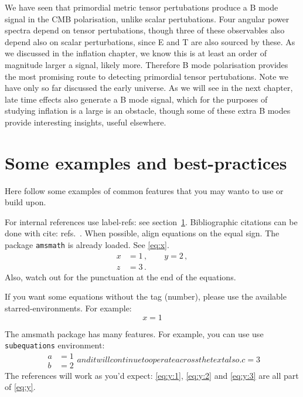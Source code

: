 \documentclass[a4paper,11pt]{article}
\begin{document}
We have seen that primordial metric tensor pertubations produce a B mode signal in the CMB polarisation, unlike scalar pertubations. Four angular power spectra depend on tensor pertubations, though three of these observables also depend also on scalar perturbations, since E and T are also sourced by  these. As we discussed in the inflation chapter, we know this is at least an order of magnitude larger a signal, likely more. Therefore B mode polarisation provides the most promising route to detecting primordial tensor pertubations. Note we have only so far discussed the early universe. As we will see in the next chapter, late time effects also generate a B mode signal, which for the purposes of studying inflation is a large is an obstacle, though some of these extra B modes provide interesting insights, useful elsewhere.














\section{Some examples and best-practices}
\label{sec:intro}

Here follow some examples of common features that you may wanto to use
or build upon.

For internal references use label-refs: see section~\ref{sec:intro}.
Bibliographic citations can be done with cite: refs.~\cite{a,b,c}.
When possible, align equations on the equal sign. The package
\texttt{amsmath} is already loaded. See \eqref{eq:x}.
\begin{equation}
\label{eq:x}
\begin{split}
x &= 1 \,,
\qquad
y = 2 \,,
\\
z &= 3 \,.
\end{split}
\end{equation}
Also, watch out for the punctuation at the end of the equations.


If you want some equations without the tag (number), please use the available
starred-environments. For example:
\begin{equation*}
x = 1
\end{equation*}

The amsmath package has many features. For example, you can use use
\texttt{subequations} environment:
\begin{subequations}\label{eq:y}
\begin{align}
\label{eq:y:1}
a & = 1
\\
\label{eq:y:2}
b & = 2
\end{align}
and it will continue to operate across the text also.
\begin{equation}
\label{eq:y:3}
c = 3
\end{equation}
\end{subequations}
The references will work as you'd expect: \eqref{eq:y:1},
\eqref{eq:y:2} and \eqref{eq:y:3} are all part of \eqref{eq:y}.
\end{document}
